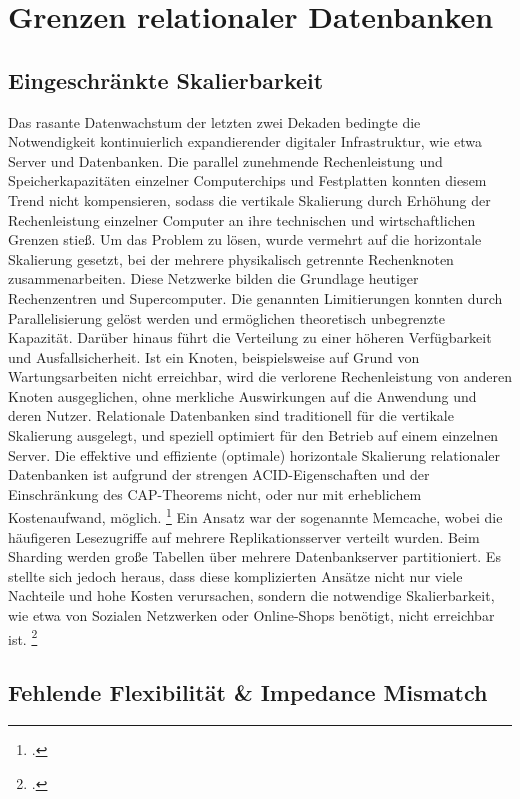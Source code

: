 \section{Grenzen relationaler Datenbanken}

\subsection{Eingeschränkte Skalierbarkeit}

Das rasante Datenwachstum der letzten zwei Dekaden bedingte die Notwendigkeit kontinuierlich expandierender digitaler Infrastruktur, wie etwa Server und Datenbanken. Die parallel zunehmende Rechenleistung und Speicherkapazitäten einzelner Computerchips und Festplatten konnten diesem Trend nicht kompensieren, sodass die vertikale Skalierung durch Erhöhung der Rechenleistung einzelner Computer an ihre technischen und wirtschaftlichen Grenzen stieß. Um das Problem zu lösen, wurde vermehrt auf die horizontale Skalierung gesetzt, bei der mehrere physikalisch getrennte Rechenknoten zusammenarbeiten. Diese Netzwerke bilden die Grundlage heutiger Rechenzentren und Supercomputer. Die genannten Limitierungen konnten durch Parallelisierung gelöst werden und ermöglichen theoretisch unbegrenzte Kapazität. Darüber hinaus führt die Verteilung zu einer höheren Verfügbarkeit und Ausfallsicherheit. Ist ein Knoten, beispielsweise auf Grund von Wartungsarbeiten nicht erreichbar, wird die verlorene Rechenleistung von anderen Knoten ausgeglichen, ohne merkliche Auswirkungen auf die Anwendung und deren Nutzer. Relationale Datenbanken sind traditionell für die vertikale Skalierung ausgelegt, und speziell optimiert für den Betrieb auf einem einzelnen Server. Die effektive und effiziente (optimale) horizontale Skalierung relationaler Datenbanken ist aufgrund der strengen ACID-Eigenschaften und der Einschränkung des CAP-Theorems nicht, oder nur mit erheblichem Kostenaufwand, möglich. \footcite[S. 1]{schreinerWhenRelationalBasedApplications2019} Ein Ansatz war der sogenannte Memcache, wobei die häufigeren Lesezugriffe auf mehrere Replikationsserver verteilt wurden. Beim Sharding werden große Tabellen über mehrere Datenbankserver partitioniert. Es stellte sich jedoch heraus, dass diese komplizierten Ansätze nicht nur viele Nachteile und hohe Kosten verursachen, sondern die notwendige Skalierbarkeit, wie etwa von Sozialen Netzwerken oder Online-Shops benötigt, nicht erreichbar ist. \footcite[S. 41-43]{harrisonNextGenerationDatabases2015} 

\subsection{Fehlende Flexibilität \& Impedance Mismatch}

